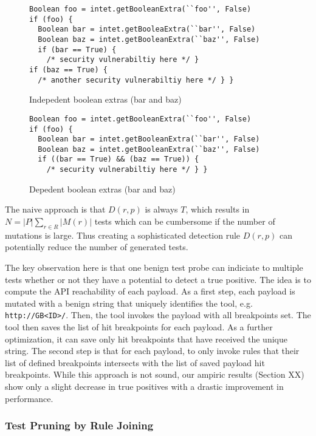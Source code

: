 \begin{figure}
\begin{lstlisting}
Boolean foo = intet.getBooleanExtra(``foo'', False)
if (foo) {
  Boolean bar = intet.getBooleaExtra(``bar'', False)
  Boolean baz = intet.getBooleanExtra(``baz'', False)
  if (bar == True) {
    /* security vulnerabiltiy here */ }
if (baz == True) {
  /* another security vulnerabiltiy here */ } }
\end{lstlisting}
\caption{\label{fig:Indepedent-boolean-extras}Indepedent boolean extras (bar
and baz)}
\end{figure}


\begin{figure}
\begin{lstlisting}
Boolean foo = intet.getBooleanExtra(``foo'', False)
if (foo) {
  Boolean bar = intet.getBooleanExtra(``bar'', False)
  Boolean baz = intet.getBooleanExtra(``baz'', False)
  if ((bar == True) && (baz == True)) {
    /* security vulnerabiltiy here */ } }
\end{lstlisting}
\caption{\label{fig:Depedent-boolean-extras}Depedent boolean extras (bar and
baz)}
\end{figure}



%
The naive approach is that $D(r,p)$ is always $T$, which results
in $N=|P|\sum_{r\in R}|M(r)|$ tests which can be cumbersome if the
number of mutations is large. Thus creating a sophisticated detection
rule $D(r,p)$ can potentially reduce the number of generated tests. 

The key observation here is that one benign test probe can indiciate
to multiple tests whether or not they have a potential to detect a
true positive. The idea is to compute the API reachability of each
payload. As a first step, each payload is mutated with a benign string
that uniquely identifies the tool, e.g. \texttt{http://GB<ID>/}. Then,
the tool invokes the payload with all breakpoints set. The tool then
saves the list of hit breakpoints for each payload. As a further optimization,
it can save only hit breakpoints that have received the unique string.
The second step is that for each payload, to only invoke rules that
their list of defined breakpoints intersects with the list of saved
payload hit breakpoints. While this approach is not sound, our ampiric
results (Section XX) show only a slight decrease in true positives
with a drastic improvement in performance.


\subsubsection{Test Pruning by Rule Joining}
%
